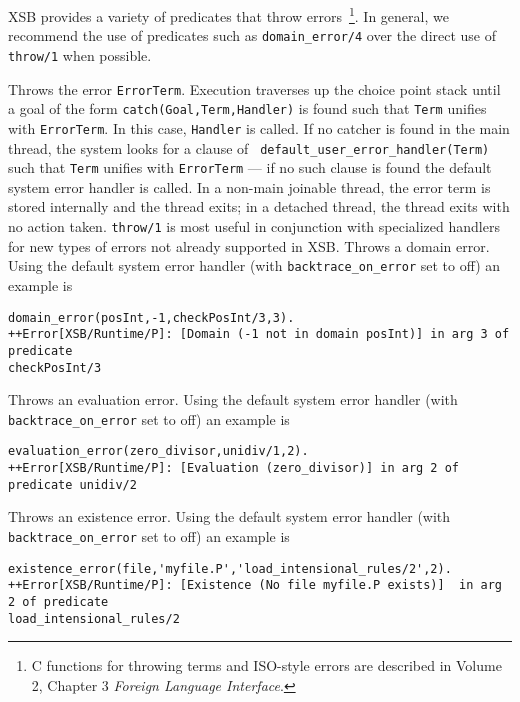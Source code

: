 XSB provides a variety of predicates that throw errors~\footnote{C
  functions for throwing terms and ISO-style errors are described in
  Volume 2, Chapter 3 {\em Foreign Language Interface}.}. In general,
we recommend the use of predicates such as {\tt domain\_error/4} over
the direct use of {\tt throw/1} when possible.
%
\begin{description}
%
Throws the error {\tt ErrorTerm}.  Execution traverses up the choice
point stack until a goal of the form {\tt catch(Goal,Term,Handler)} is
found such that {\tt Term} unifies with {\tt ErrorTerm}.  In this
case, {\tt Handler} is called.  If no catcher is found in the main
thread, the system looks for a clause of {\tt
  default\_user\_error\_handler(Term)} such that {\tt Term} unifies
with {\tt ErrorTerm} --- if no such clause is found the default system
error handler is called.  In a non-main joinable thread, the error
term is stored internally and the thread exits; in a detached thread,
the thread exits with no action taken.  {\tt throw/1} is most useful
in conjunction with specialized handlers for new types of errors not
already supported in XSB.
%
%
Throws a domain error.  Using the default system error handler (with
{\tt backtrace\_on\_error} set to off) an example is {\small
\begin{verbatim}
domain_error(posInt,-1,checkPosInt/3,3).
++Error[XSB/Runtime/P]: [Domain (-1 not in domain posInt)] in arg 3 of predicate 
checkPosInt/3
\end{verbatim} }
%
%
Throws an evaluation error.  Using the default system error handler
(with {\tt backtrace\_on\_error} set to off) an example is {\small
\begin{verbatim}
evaluation_error(zero_divisor,unidiv/1,2).
++Error[XSB/Runtime/P]: [Evaluation (zero_divisor)] in arg 2 of predicate unidiv/2
\end{verbatim} }
%
%
Throws an existence error.  Using the default system error
handler (with {\tt backtrace\_on\_error} set to off) an example is 
{\small 
\begin{verbatim}
existence_error(file,'myfile.P','load_intensional_rules/2',2).
++Error[XSB/Runtime/P]: [Existence (No file myfile.P exists)]  in arg 2 of predicate 
load_intensional_rules/2

\end{verbatim}}
\end{description}
